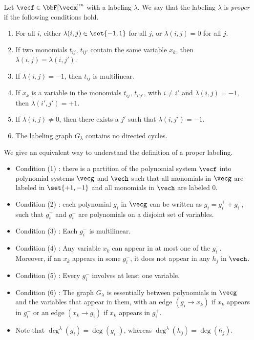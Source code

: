 \begin{definition} \label{def:properLabel}
  Let $\vecf \in \bbF[\vecx]^m$ with a labeling $\lambda$.
    We say that the labeling $\lambda$ is \textit{proper} if the following
  conditions hold.\\[-6mm]
  \begin{enumerate}
    \item[(1)] For all $i$, either $\lambda(i, j) \in \set{-1, 1}$ for all $j$, or $\lambda(i, j) = 0$ for all $j$.
    \item[(2)] If two monomials $t_{i j}$, $t_{i j'}$ contain the same
          variable $x_k$, then $\lambda(i, j) = \lambda(i, j')$.
    \item[(3)] If $\lambda(i, j) = -1$, then $t_{i j}$ is multilinear.
    \item[(4)] If $x_k$ is a variable in the monomials
          $t_{i j}$, $t_{i' j'}$,
          with $i \neq i'$ and $\lambda(i, j) = -1$, then
          $\lambda(i', j') = +1$.
    \item[(5)] If $\lambda(i, j) \neq 0$, then there exists a $j'$ such that
          $\lambda(i, j') = -1$.
    \item[(6)] The labeling graph $G_{\lambda}$ contains no directed cycles.
  \end{enumerate}
\end{definition}

\noindent We give an equivalent way to understand the definition of a proper labeling.
\begin{itemize}[label=$\triangleright$]
\item Condition (1) : there is a partition of the polynomial system $\vecf$ into polynomial systems $\vecg$ and $\vech$ such that all monomials in $\vecg$ are labeled in $\set{+1, -1}$ and all monomials in $\vech$ are labeled $0$.
\item Condition (2) : each polynomial $g_i$ in $\vecg$ can be written as $g_i = g_i^+ + g_i^{-}$, such that $g_i^+$ and $g_i^-$ are polynomials on a disjoint set of variables.
\item Condition (3) : Each $g_i^-$ is multilinear.
\item Condition (4) : Any variable $x_k$ can appear in at most one of the $g_i^-$. Moreover, if an $x_k$ appears in some $g_i^-$, it does not appear in any $h_j$ in $\vech$.
\item Condition (5) : Every $g_i^-$ involves at least one variable.
\item Condition (6) : The graph $G_{\lambda}$ is essentially between polynomials in $\vecg$ and the variables that appear in them, with an edge $(g_i \to x_k)$ if $x_k$ appears in $g_i^-$ or an edge $(x_k \to g_i)$ if $x_k$ appears in $g_i^+$.
\item Note that $\deg^\lambda(g_i) = \deg(g_i^-)$, whereas $\deg^\lambda(h_j) = \deg(h_j)$.
\end{itemize}

